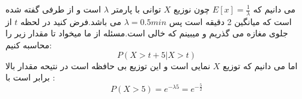 
می دانیم که $E[x] = \frac{1}{\lambda}$ چون نوزیع $X$ توانی با پارمتر $\lambda$ است و از طرفی گفته شده است که میانگین 2 دقیقه است پس $\lambda = 0.5 min $ می باشد.فرض کنید در لحظه $t$ از جلوی مغازه می گذریم و میبینم که خالی است.مسئله از ما میخواد تا مقدار زیر را محاسبه کنیم:
$$P(X > t + 5 | X > t)$$ 
اما می دانیم که توزیع $X$ نمایی است و این توزیع بی حافظه است در نتیحه مقدار بالا برابر است با :
$$P(X > 5) = e ^ {-\lambda 5} = e ^ {- \frac{5}{2}}$$